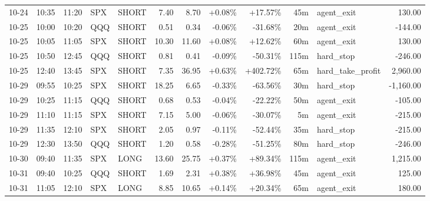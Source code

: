 \documentclass[11pt,a4paper,twoside]{article}
\begin{document}
\begin{center}
\begin{longtable}{>{\color{txtmain}}l l l l l r r r r r >{\color{txtmain}}l r}
10-24 & 10:35 & 11:20 & SPX & SHORT & 7.40 & 8.70 & \textcolor{wingreen}{+0.08\%} & \textcolor{wingreen}{+17.57\%} & 45m & agent\_exit & \textcolor{wingreen}{130.00} \\
10-25 & 10:00 & 10:20 & QQQ & SHORT & 0.51 & 0.34 & \textcolor{lossred}{-0.06\%} & \textcolor{lossred}{-31.68\%} & 20m & agent\_exit & \textcolor{lossred}{-144.00} \\
10-25 & 10:05 & 11:05 & SPX & SHORT & 10.30 & 11.60 & \textcolor{wingreen}{+0.08\%} & \textcolor{wingreen}{+12.62\%} & 60m & agent\_exit & \textcolor{wingreen}{130.00} \\
10-25 & 10:50 & 12:45 & QQQ & SHORT & 0.81 & 0.41 & \textcolor{lossred}{-0.09\%} & \textcolor{lossred}{-50.31\%} & 115m & hard\_stop & \textcolor{lossred}{-246.00} \\
10-25 & 12:40 & 13:45 & SPX & SHORT & 7.35 & 36.95 & \textcolor{wingreen}{+0.63\%} & \textcolor{wingreen}{+402.72\%} & 65m & hard\_take\_profit & \textcolor{wingreen}{2,960.00} \\
10-29 & 09:55 & 10:25 & SPX & SHORT & 18.25 & 6.65 & \textcolor{lossred}{-0.33\%} & \textcolor{lossred}{-63.56\%} & 30m & hard\_stop & \textcolor{lossred}{-1,160.00} \\
10-29 & 10:25 & 11:15 & QQQ & SHORT & 0.68 & 0.53 & \textcolor{lossred}{-0.04\%} & \textcolor{lossred}{-22.22\%} & 50m & agent\_exit & \textcolor{lossred}{-105.00} \\
10-29 & 11:10 & 11:15 & SPX & SHORT & 7.15 & 5.00 & \textcolor{lossred}{-0.06\%} & \textcolor{lossred}{-30.07\%} & 5m & agent\_exit & \textcolor{lossred}{-215.00} \\
10-29 & 11:35 & 12:10 & SPX & SHORT & 2.05 & 0.97 & \textcolor{lossred}{-0.11\%} & \textcolor{lossred}{-52.44\%} & 35m & hard\_stop & \textcolor{lossred}{-215.00} \\
10-29 & 12:30 & 13:50 & QQQ & SHORT & 1.20 & 0.58 & \textcolor{lossred}{-0.28\%} & \textcolor{lossred}{-51.25\%} & 80m & hard\_stop & \textcolor{lossred}{-246.00} \\
10-30 & 09:40 & 11:35 & SPX & LONG & 13.60 & 25.75 & \textcolor{wingreen}{+0.37\%} & \textcolor{wingreen}{+89.34\%} & 115m & agent\_exit & \textcolor{wingreen}{1,215.00} \\
10-31 & 09:40 & 10:25 & QQQ & SHORT & 1.69 & 2.31 & \textcolor{wingreen}{+0.38\%} & \textcolor{wingreen}{+36.98\%} & 45m & agent\_exit & \textcolor{wingreen}{125.00} \\
10-31 & 11:05 & 12:10 & SPX & LONG & 8.85 & 10.65 & \textcolor{wingreen}{+0.14\%} & \textcolor{wingreen}{+20.34\%} & 65m & agent\_exit & \textcolor{wingreen}{180.00} \\

\end{longtable}
\end{center}
\end{document}
